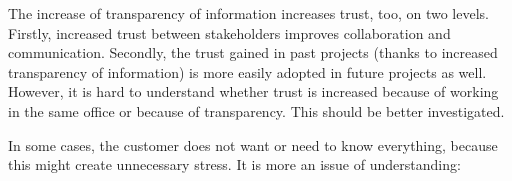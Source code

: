 %
% 
%
%
%

 The increase of transparency of information increases trust, too, on two levels. Firstly, increased trust between stakeholders improves collaboration and communication. Secondly, the trust gained in past projects (thanks to increased transparency of information) is more easily adopted in future projects as well. However, it is hard to understand whether trust is increased because of working in the same office or because of transparency. This should be better investigated. %

 In some cases, the customer does not want or need to know everything, because this might create unnecessary stress. It is more an issue of understanding: 

